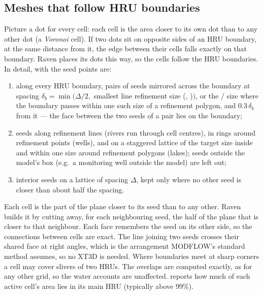 \subsection{Meshes that follow HRU boundaries}
Picture a dot for every cell: each cell is the area closer to its own dot than to any other dot (a \emph{Voronoi} cell). If
two dots sit on opposite sides of an HRU boundary, at the same distance from it, the edge between their cells falls exactly
on that boundary. Raven places its dots this way, so the cells follow the HRU boundaries. In detail, with
 the seed points are:
\begin{enumerate}
\item along every HRU boundary, pairs of seeds mirrored across the boundary at spacing $\delta_b=\min(\Delta/2,$ smallest
line refinement size (, )$)$, or the / size where the boundary passes within
one such size of a refinement polygon, and $0.3\,\delta_b$ from it --- the face between the two seeds of a pair lies on the boundary;
\item seeds along refinement lines (rivers run through cell centres), in rings around refinement points (wells), and on a
staggered lattice of the target size inside and within one size around refinement polygons (lakes); seeds outside the
model's box (e.g.\ a monitoring well outside the model) are left out;
\item interior seeds on a lattice of spacing $\Delta$, kept only where no other seed is closer than about half the spacing.
\end{enumerate}
Each cell is the part of the plane closer to its seed than to any other. Raven builds it by cutting away, for each
neighbouring seed, the half of the plane that is closer to that neighbour. Each face remembers the seed on its other side, so
the connections between cells are exact. The line joining two seeds crosses their shared face at right angles, which is the
arrangement MODFLOW's standard method assumes, so no XT3D is needed. Where boundaries meet at sharp corners a cell may cover slivers of two HRUs. The overlaps are computed exactly, as for any
other grid, so the water accounts are unaffected.  reports how much of each active cell's area lies
in its main HRU (typically above 99\%).

